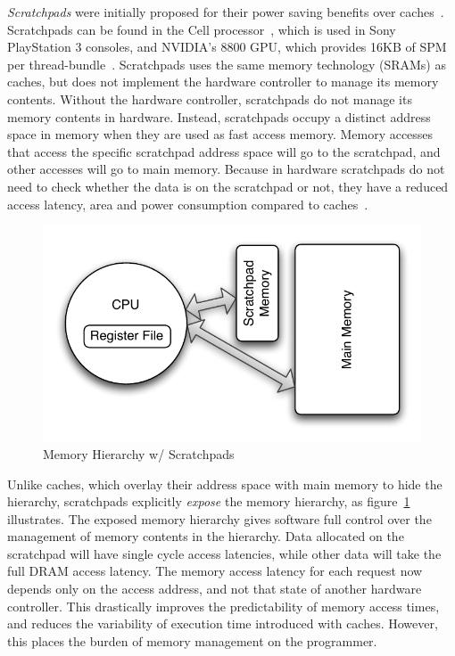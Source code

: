 \emph{Scratchpads} were initially proposed for their power saving benefits over caches~\cite{Banakar2002}.
Scratchpads can be found in the Cell processor~\cite{cellproc}, which is used in Sony PlayStation 3 consoles, and NVIDIA's 8800 GPU, which provides 16KB of SPM per thread-bundle~\cite{8800gpu}.
Scratchpads uses the same memory technology (SRAMs) as caches, but does not implement the hardware controller to manage its memory contents.
Without the hardware controller, scratchpads do not manage its memory contents in hardware.
Instead, scratchpads occupy a distinct address space in memory when they are used as fast access memory.
Memory accesses that access the specific scratchpad address space will go to the scratchpad, and other accesses will go to main memory. 
Because in hardware scratchpads do not need to check whether the data is on the scratchpad or not, they have a reduced access latency, area and power consumption compared to caches~\cite{Banakar2002}. 

\begin{figure}
  \vspace{-20pt}
  \begin{center}
    \includegraphics[scale=.5]{figs/pret_mem_hierarchy}
  \end{center}
  \vspace{-10pt}
  \caption{Memory Hierarchy w/ Scratchpads}
  \label{fig:pret_mem_hierarchy}
\end{figure}   

Unlike caches, which overlay their address space with main memory to hide the hierarchy, scratchpads explicitly \emph{expose} the memory hierarchy, as figure~\ref{fig:pret_mem_hierarchy} illustrates.  
The exposed memory hierarchy gives software full control over the management of memory contents in the hierarchy.
Data allocated on the scratchpad will have single cycle access latencies, while other data will take the full DRAM access latency. 
The memory access latency for each request now depends only on the access address, and not that state of another hardware controller. 
This drastically improves the predictability of memory access times, and reduces the variability of execution time introduced with caches.
However, this places the burden of memory management on the programmer. 

